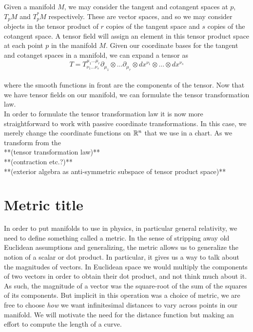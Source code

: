     Given a manifold $M$, we may consider the tangent and cotangent spaces at $p$, $T_pM$ and $T^*_pM$ respectively.  These are vector spaces, and so we may consider objects in the tensor product of $r$ copies of the tangent space and $s$ copies of the cotangent space.  A tensor field will assign an element in this tensor product space at each point $p$ in the manifold $M$.  Given our coordinate bases for the tangent and cotanget spaces in a manifold, we can expand a tensor as
    \begin{equation*}
    	T = T^{\mu_1\dots \mu_r}_{\nu_1 \dots \nu_s}\partial_{\mu_1}\otimes \dots \partial_{\mu_r}\otimes dx^{\nu_1}\otimes \dots \otimes dx^{\nu_s}
    \end{equation*} \\
    where the smooth functions in front are the components of the tensor.  Now that we have tensor fields on our manifold, we can formulate the tensor transformation law.\\
    
    In order to formulate the tensor transformation law it is now more straightforward to work with passive coordinate transformations.  In this case, we merely change the coordinate functions on $\mathbb{R}^n$ that we use in a chart.  As we transform from the \\
    
    **(tensor transformation law)**\\
    
**(contraction etc.?)**\\

**(exterior algebra as anti-symmetric subspace of tensor product space)**\\
\section*{Metric title}
In order to put manifolds to use in physics, in particular general relativity, we need to define something called a metric. In the sense of stripping away old Euclidean assumptions and generalizing, the metric allows us to generalize the notion of a scalar or dot product.  In particular, it gives us a way to talk about the magnitudes of vectors.  In Euclidean space we would multiply the components of two vectors in order to obtain their dot product, and not think much about it.  As such, the magnitude of a vector was the square-root of the sum of the squares of its components.  But implicit in this operation was a choice of metric, we are free to choose \textit{how} we want infinitesimal distances to vary across points in our manifold.  We will motivate the need for the distance function but making an effort to compute the length of a curve.\\

